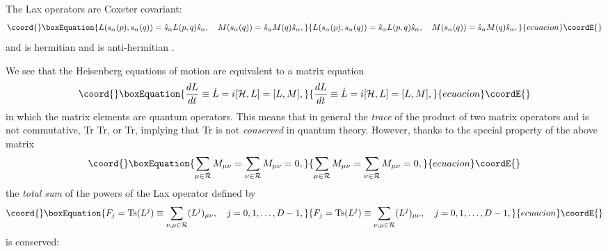 \documentclass[a4paper,12pt]{article}
\begin{document}
The Lax operators are Coxeter covariant:
\begin{equation}\coord{}\boxEquation{
L(s_{\alpha}(p),s_{\alpha}(q))=\hat{s}_\alpha L(p,q)\hat{s}_\alpha,\quad
M(s_{\alpha}(q))=\hat{s}_\alpha M(q)\hat{s}_\alpha,
\label{lmcoxcov}
}{
L(s_{\alpha}(p),s_{\alpha}(q))=\hat{s}_\alpha L(p,q)\hat{s}_\alpha,\quad
M(s_{\alpha}(q))=\hat{s}_\alpha M(q)\hat{s}_\alpha,
}{ecuacion}\coordE{}\end{equation}
and \coordHE{} is hermitian \coordHE{} and \coordHE{}
is anti-hermitian \coordHE{}.

We see that the Heisenberg equations of motion are equivalent to a
matrix equation \cite{bms,kps}
\begin{equation}\coord{}\boxEquation{
  {dL\over{dt}}\equiv\dot{L}=i[{\mathcal H},L]=[L,M],
}{
  {dL\over{dt}}\equiv\dot{L}=i[{\mathcal H},L]=[L,M],
}{ecuacion}\coordE{}\end{equation}
in which the matrix elements are quantum operators. This means that
in general the {\em trace} of the product of
two matrix operators \coordHE{} and
\coordHE{}  is not commutative, Tr\coordHE{} Tr\coordHE{}, or Tr\coordHE{},
implying that Tr\coordHE{} is not {\em conserved} in quantum theory.
However, thanks to the special property of the above \coordHE{} matrix
\begin{equation}\coord{}\boxEquation{
    \sum_{\mu\in\mathcal{R}}M_{\mu\nu}
=\sum_{\nu\in\mathcal{R}}M_{\mu\nu}=0,
    \label{zerosum}
}{
    \sum_{\mu\in\mathcal{R}}M_{\mu\nu}
=\sum_{\nu\in\mathcal{R}}M_{\mu\nu}=0,
    }{ecuacion}\coordE{}\end{equation}
the {\em total sum} of the powers of the Lax operator \coordHE{} defined by
\begin{equation}\coord{}\boxEquation{
   F_{j}= \mbox{Ts}(L^j)\equiv\sum_{\nu,\mu\in{\mathcal
   R}}(L^j)_{\mu\nu},
   \quad j=0,1,\ldots, D-1,
    \label{jtotsum}
}{
   F_{j}= \mbox{Ts}(L^j)\equiv\sum_{\nu,\mu\in{\mathcal
   R}}(L^j)_{\mu\nu},
   \quad j=0,1,\ldots, D-1,
    }{ecuacion}\coordE{}\end{equation}
is conserved:
\end{document}
